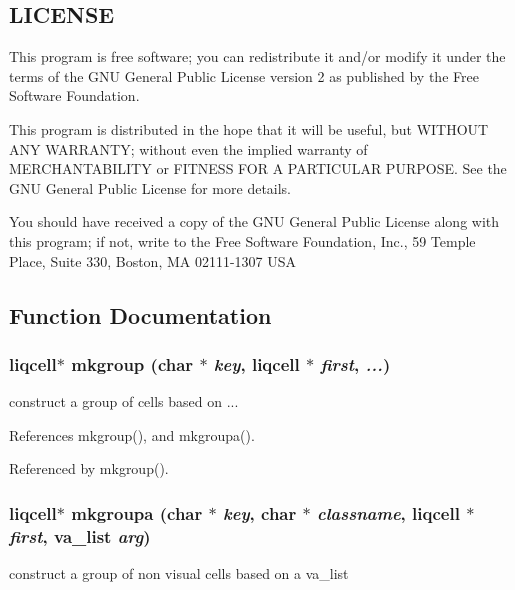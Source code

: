\subsection{LICENSE}\label{de/d77/liqui_8c_LICENSE}
This program is free software; you can redistribute it and/or modify it under the terms of the GNU General Public License version 2 as published by the Free Software Foundation.

This program is distributed in the hope that it will be useful, but WITHOUT ANY WARRANTY; without even the implied warranty of MERCHANTABILITY or FITNESS FOR A PARTICULAR PURPOSE. See the GNU General Public License for more details.

You should have received a copy of the GNU General Public License along with this program; if not, write to the Free Software Foundation, Inc., 59 Temple Place, Suite 330, Boston, MA 02111-1307 USA 

\subsection{Function Documentation}
\subsubsection[{mkgroup}]{\setlength{\rightskip}{0pt plus 5cm}liqcell$\ast$ mkgroup (char $\ast$ {\em key}, \/  liqcell $\ast$ {\em first}, \/   {\em ...})}\label{df/dca/liqcell__mk__star_8h_8f8accc4fe47de9f5fa78df46f4d97a9}


construct a group of cells based on ... 

References mkgroup(), and mkgroupa().

Referenced by mkgroup().
\subsubsection[{mkgroupa}]{\setlength{\rightskip}{0pt plus 5cm}liqcell$\ast$ mkgroupa (char $\ast$ {\em key}, \/  char $\ast$ {\em classname}, \/  liqcell $\ast$ {\em first}, \/  va\_\-list {\em arg})}\label{df/dca/liqcell__mk__star_8h_608587c6ea778a212270715cf6b81b75}


construct a group of non visual cells based on a va\_\-list 

